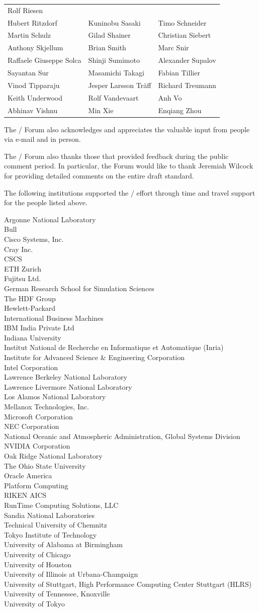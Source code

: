 \begin{center}
\begin{tabular}{lll}
Rolf Riesen \\
Hubert Ritzdorf &
Kuninobu Sasaki &
Timo Schneider \\
Martin Schulz &
Gilad Shainer&
Christian Siebert \\
Anthony Skjellum &
Brian Smith &
Marc Snir \\
Raffaele Giuseppe Solca &
Shinji Sumimoto &
Alexander Supalov \\
Sayantan Sur &
Masamichi Takagi &
Fabian Tillier   \\
Vinod Tipparaju &
Jesper Larsson Tr\"aff &
Richard Treumann \\
Keith Underwood &
Rolf Vandevaart &
Anh Vo \\
Abhinav Vishnu &
Min Xie&
Enqiang Zhou\\
\end{tabular}
\end{center}

The \MPI/ Forum also acknowledges and appreciates the valuable input
from people via e-mail and in person.

The \MPI/ Forum also thanks those that provided feedback during the
public comment period.  In particular, the Forum would like to thank
Jeremiah Wilcock for providing detailed comments on the entire draft
standard. 

The following institutions supported the \MPIIII/ effort through
time and travel support for the people listed above.

\medskip

\begin{obeylines}
Argonne National Laboratory
Bull 
Cisco Systems, Inc.
Cray Inc.
CSCS
ETH Zurich
Fujitsu Ltd.
German Research School for Simulation Sciences
The HDF Group
Hewlett-Packard
International Business Machines
IBM India Private Ltd
Indiana University
Institut National de Recherche en Informatique et Automatique (Inria)
Institute for Advanced Science \& Engineering Corporation
Intel Corporation
Lawrence Berkeley National Laboratory
Lawrence Livermore National Laboratory
Los Alamos National Laboratory
Mellanox Technologies, Inc.
Microsoft Corporation
NEC Corporation
National Oceanic and Atmospheric Administration, Global Systems Division
NVIDIA Corporation
Oak Ridge National Laboratory
The Ohio State University
Oracle America
Platform Computing
RIKEN AICS
RunTime Computing Solutions, LLC
Sandia National Laboratories
Technical University of Chemnitz
Tokyo Institute of Technology
University of Alabama at Birmingham
University of Chicago
University of Houston
University of Illinois at Urbana-Champaign
University of Stuttgart, High Performance Computing Center Stuttgart (HLRS)
University of Tennessee, Knoxville
University of Tokyo
\end{obeylines}

